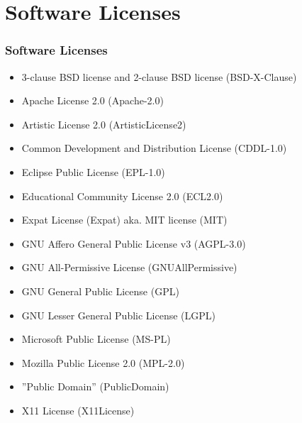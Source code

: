 \documentclass[xcolor=table, notheorems, hyperref={pdfpagelabels=false}]{beamer}
\begin{document}
\section{Software Licenses}
\begin{frame}
\frametitle{Software Licenses}
\begin{itemize}
\item 3-clause BSD license and 2-clause BSD license (BSD-X-Clause) 
\item Apache License 2.0 (Apache-2.0)
\item Artistic License 2.0 (ArtisticLicense2)
\item Common Development and Distribution License (CDDL-1.0)
\item Eclipse Public License (EPL-1.0)
\item Educational Community License 2.0 (ECL2.0)
\item Expat License (Expat) aka.  MIT license (MIT) 
\item GNU Affero General Public License v3 (AGPL-3.0)
\item GNU All-Permissive License (GNUAllPermissive)
\item GNU General Public License (GPL)
\item GNU Lesser General Public License (LGPL)
\item Microsoft Public License (MS-PL)
\item Mozilla Public License 2.0 (MPL-2.0)
\item ''Public Domain'' (PublicDomain)
\item X11 License (X11License)
\end{itemize}
\end{frame}

\end{document}
